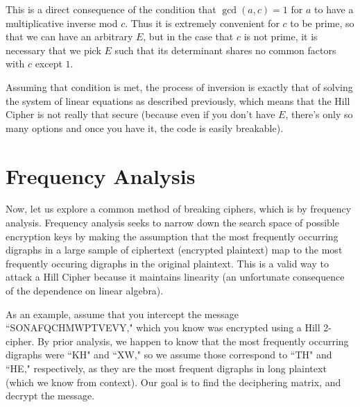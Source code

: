 \documentclass{article}
\begin{document}
\noindent This is a direct consequence of the condition that $\gcd(a, c) = 1$ for $a$ to have a multiplicative inverse mod $c$. Thus it is extremely convenient for $c$ to be prime, so that we can have an arbitrary $E$, but in the case that $c$ is not prime, it is necessary that we pick $E$ such that its determinant shares no common factors with $c$ except $1$. \medskip

\noindent Assuming that condition is met, the process of inversion is exactly that of solving the system of linear equations as described previously, which means that the Hill Cipher is not really that secure (because even if you don't have $E$, there's only so many options and once you have it, the code is easily breakable).

\section{Frequency Analysis}
Now, let us explore a common method of breaking ciphers, which is by frequency analysis. Frequency analysis seeks to narrow down the search space of possible encryption keys by making the assumption that the most frequently occurring digraphs in a large sample of ciphertext (encrypted plaintext) map to the most frequently occuring digraphs in the original plaintext. This is a valid way to attack a Hill Cipher because it maintains linearity (an unfortunate consequence of the dependence on linear algebra). \medskip

\noindent As an example, assume that you intercept the message ``SONAFQCHMWPTVEVY," which you know was encrypted using a Hill 2-cipher. By prior analysis, we happen to know that the most frequently occurring digraphs were ``KH" and ``XW," so we assume those correspond to ``TH" and ``HE," respectively, as they are the most frequent digraphs in long plaintext (which we know from context). Our goal is to find the deciphering matrix, and decrypt the message. \medskip
\end{document}
